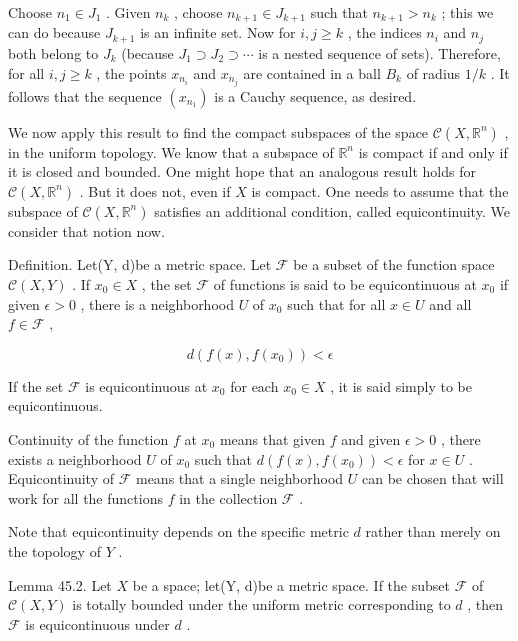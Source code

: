 Choose \({n}_{1} \in  {J}_{1}\) . Given \({n}_{k}\) , choose \({n}_{k + 1} \in  {J}_{k + 1}\) such that \({n}_{k + 1} > {n}_{k}\) ; this we can do because \({J}_{k + 1}\) is an infinite set. Now for \(i,j \geq  k\) , the indices \({n}_{i}\) and \({n}_{j}\) both belong to \({J}_{k}\) (because \({J}_{1} \supset  {J}_{2} \supset  \cdots\) is a nested sequence of sets). Therefore, for all \(i,j \geq  k\) , the points \({x}_{{n}_{i}}\) and \({x}_{{n}_{j}}\) are contained in a ball \({B}_{k}\) of radius \(1/k\) . It follows that the sequence \(\left( {x}_{{n}_{1}}\right)\) is a Cauchy sequence, as desired.

We now apply this result to find the compact subspaces of the space \(\mathcal{C}\left( {X,{\mathbb{R}}^{n}}\right)\) , in the uniform topology. We know that a subspace of \({\mathbb{R}}^{n}\) is compact if and only if it is closed and bounded. One might hope that an analogous result holds for \(\mathcal{C}\left( {X,{\mathbb{R}}^{n}}\right)\) . But it does not, even if \(X\) is compact. One needs to assume that the subspace of \(\mathcal{C}\left( {X,{\mathbb{R}}^{n}}\right)\) satisfies an additional condition, called equicontinuity. We consider that notion now.

Definition. Let(Y, d)be a metric space. Let \(\mathcal{F}\) be a subset of the function space \(\mathcal{C}\left( {X,Y}\right)\) . If \({x}_{0} \in  X\) , the set \(\mathcal{F}\) of functions is said to be equicontinuous at \({x}_{0}\) if given \(\epsilon  > 0\) , there is a neighborhood \(U\) of \({x}_{0}\) such that for all \(x \in  U\) and all \(f \in  \mathcal{F}\) ,

\[
d\left( {f\left( x\right) ,f\left( {x}_{0}\right) }\right)  < \epsilon
\]

If the set \(\mathcal{F}\) is equicontinuous at \({x}_{0}\) for each \({x}_{0} \in  X\) , it is said simply to be equicontinuous.

Continuity of the function \(f\) at \({x}_{0}\) means that given \(f\) and given \(\epsilon  > 0\) , there exists a neighborhood \(U\) of \({x}_{0}\) such that \(d\left( {f\left( x\right) ,f\left( {x}_{0}\right) }\right)  < \epsilon\) for \(x \in  U\) . Equicontinuity of \(\mathcal{F}\) means that a single neighborhood \(U\) can be chosen that will work for all the functions \(f\) in the collection \(\mathcal{F}\) .

Note that equicontinuity depends on the specific metric \(d\) rather than merely on the topology of \(Y\) .

Lemma 45.2. Let \(X\) be a space; let(Y, d)be a metric space. If the subset \(\mathcal{F}\) of \(\mathcal{C}\left( {X,Y}\right)\) is totally bounded under the uniform metric corresponding to \(d\) , then \(\mathcal{F}\) is equicontinuous under \(d\) .

